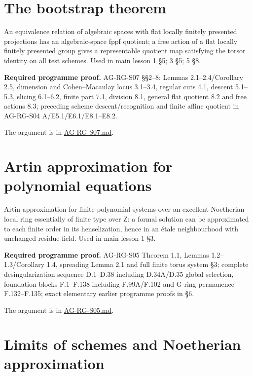 \documentclass[11pt,a4paper,openany]{report}
\begin{document}
\section{The bootstrap theorem}\label{the-bootstrap-theorem}

An equivalence relation of algebraic spaces with flat locally finitely presented projections has an algebraic-space fppf quotient; a free action of a flat locally finitely presented group gives a representable quotient map satisfying the torsor identity on all test schemes. Used in main lesson 1 §5; 3 §5; 5 §8.

\textbf{Required programme proof.} AG-RG-S07 §§2--8: Lemmas 2.1--2.4/Corollary 2.5, dimension and Cohen--Macaulay locus 3.1--3.4, regular cuts 4.1, descent 5.1--5.3, slicing 6.1--6.2, finite part 7.1, division 8.1, general flat quotient 8.2 and free actions 8.3; preceding scheme descent/recognition and finite affine quotient in AG-RG-S04 A/E5.1/E6.1/E8.1--E8.2.

The argument is in \href{https://github.com/KokunoYumeto/open-math-courses/blob/main/docs/courses/AG-RG/AG-RG-S07.md}{AG-RG-S07.md}.

\section{Artin approximation for polynomial equations}\label{artin-approximation-for-polynomial-equations}

Artin approximation for finite polynomial systems over an excellent Noetherian local ring essentially of finite type over Z: a formal solution can be approximated to each finite order in its henselization, hence in an étale neighbourhood with unchanged residue field. Used in main lesson 1 §3.

\textbf{Required programme proof.} AG-RG-S05 Theorem 1.1, Lemmas 1.2--1.3/Corollary 1.4, spreading Lemma 2.1 and full finite torus system §3; complete desingularization sequence D.1--D.38 including D.34A/D.35 global selection, foundation blocks F.1--F.138 including F.99A/F.102 and G-ring permanence F.132--F.135; exact elementary earlier programme proofs in §6.

The argument is in \href{https://github.com/KokunoYumeto/open-math-courses/blob/main/docs/courses/AG-RG/AG-RG-S05.md}{AG-RG-S05.md}.

\section{Limits of schemes and Noetherian approximation}\label{limits-of-schemes-and-noetherian-approximation}
\end{document}
